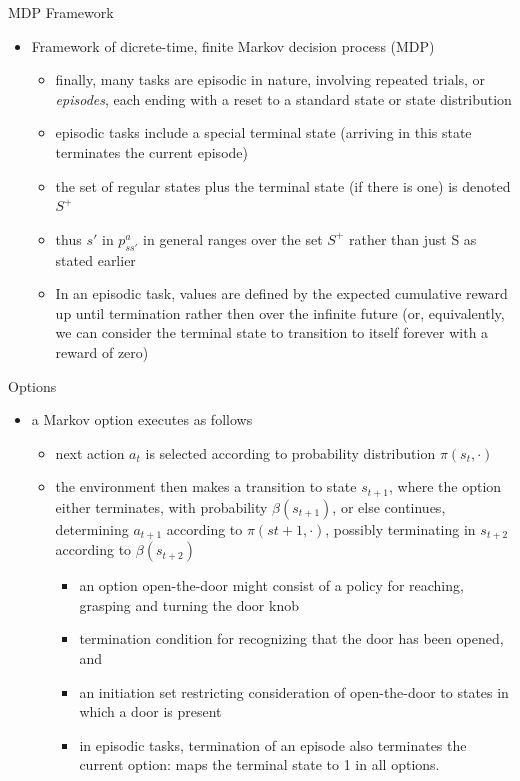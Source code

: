 \begin{frame}{MDP Framework}
    \begin{itemize}
        \item Framework of dicrete-time, finite Markov decision process (MDP)
        \begin{itemize}
            \item finally, many tasks are episodic in nature, involving repeated trials, or \textit{episodes}, each ending with a reset to a standard state or state distribution
            \item episodic tasks include a special terminal state (arriving in this state terminates the current episode)
            \item the set of regular states plus the terminal state (if there is one) is denoted $S^+$
            \item thus $s'$ in $p^a_{ss'}$ in general ranges over the set $S^+$ rather than just S as stated earlier
            \item In an episodic task, values are defined by the expected cumulative reward up until termination rather then over the infinite future (or, equivalently, we can consider the terminal state to transition to itself forever with a reward of zero)
        \end{itemize}
    \end{itemize}
\end{frame}

\begin{frame}{Options}
    \begin{itemize}
        \item a Markov option executes as follows
        \begin{itemize}
            \item next action $a_t$ is selected according to probability distribution $\pi(s_t,\cdot)$
            \item the environment then makes a transition to state $s_{t+1}$, where the option either terminates, with probability $\beta(s_{t+1})$, or else continues, determining $a_{t+1}$ according to $\pi(s{t+1},\cdot)$, possibly terminating in $s_{t+2}$ according to $\beta(s_{t+2})$
            \begin{itemize}
                \item an option open-the-door might consist of a policy for reaching, grasping and turning the door knob
                \item termination condition for recognizing that the door has been opened, and
                \item an initiation set restricting consideration of open-the-door to states in which a door is present
                \item in episodic tasks, termination of an episode also terminates the current option: maps the terminal state to 1 in all options.
            \end{itemize}
        \end{itemize}
    \end{itemize}
\end{frame}

